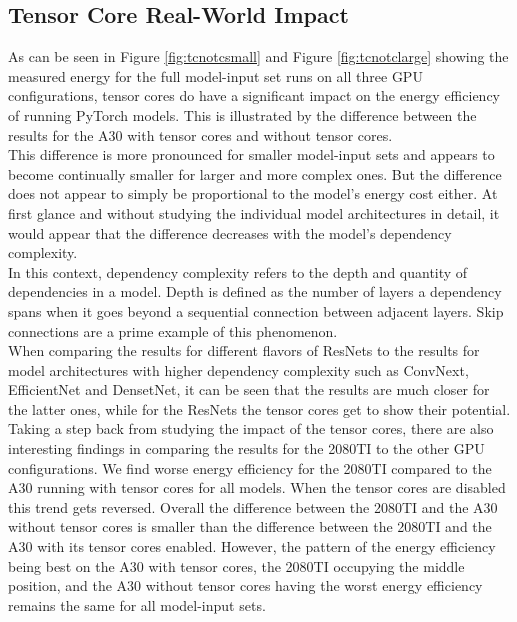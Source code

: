 \setcounter{savedpage}{\value{page}}






\setcounter{page}{\numexpr\value{savedpage}+3\relax}


\subsection{Tensor Core Real-World Impact}
As can be seen in Figure \ref{fig:tcnotcsmall} and Figure \ref{fig:tcnotclarge} showing the measured energy for the full model-input set runs on all three GPU configurations, tensor cores do have a significant impact on the energy efficiency of running PyTorch models. This is illustrated by the difference between the results for the A30 with tensor cores and without tensor cores. \\
This difference is more pronounced for smaller model-input sets and appears to become continually smaller for larger and more complex ones. But the difference does not appear to simply be proportional to the model's energy cost either. At first glance and without studying the individual model architectures in detail, it would appear that the difference decreases with the model's dependency complexity. \\
In this context, dependency complexity refers to the depth and quantity of dependencies in a model. Depth is defined as the number of layers a dependency spans when it goes beyond a sequential connection between adjacent layers. Skip connections are a prime example of this phenomenon. \\
When comparing the results for different flavors of ResNets to the results for model architectures with higher dependency complexity such as ConvNext, EfficientNet and DensetNet, it can be seen that the results are much closer for the latter ones, while for the ResNets the tensor cores get to show their potential. \\
Taking a step back from studying the impact of the tensor cores, there are also interesting findings in comparing the results for the 2080TI to the other GPU configurations. We find worse energy efficiency for the 2080TI compared to the A30 running with tensor cores for all models. When the tensor cores are disabled this trend gets reversed. Overall the difference between the 2080TI and the A30 without tensor cores is smaller than the difference between the 2080TI and the A30 with its tensor cores enabled. However, the pattern of the energy efficiency being best on the A30 with tensor cores, the 2080TI occupying the middle position, and the A30 without tensor cores having the worst energy efficiency remains the same for all model-input sets.


